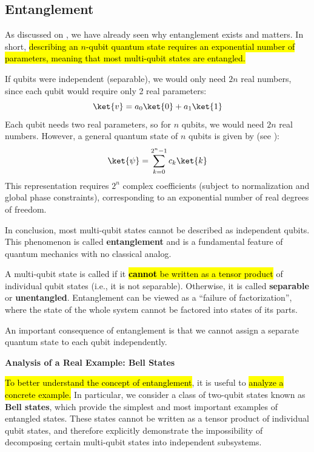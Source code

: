 \subsection{Entanglement}\label{sec:entanglement}

As discussed on , we have already seen why entanglement exists and matters. In short, \hl{describing an $n$-qubit quantum state requires an exponential number of parameters, meaning that most multi-qubit states are entangled.}

\highspace
If qubits were independent (separable), we would only need $2n$ real numbers, since each qubit would require only 2 real parameters:
\begin{equation*}
    \ket{v} = a_0 \ket{0} + a_1 \ket{1}
\end{equation*}
Each qubit needs two real parameters, so for $n$ qubits, we would need $2n$ real numbers. However, a general quantum state of $n$ qubits is given by (see ):
\begin{equation*}
    \ket{\psi} = \sum_{k=0}^{2^n-1} c_k \ket{k}
\end{equation*}
This representation requires $2^n$ complex coefficients (subject to normalization and global phase constraints), corresponding to an exponential number of real degrees of freedom.

\highspace
In conclusion, most multi-qubit states cannot be described as independent qubits. This phenomenon is called \textbf{entanglement} and is a fundamental feature of quantum mechanics with no classical analog.

\begin{definitionbox}[: Entanglement]
    A multi-qubit state is called  if it \hl{\textbf{cannot} be written as a tensor product} of individual qubit states (i.e., it is not separable). Otherwise, it is called \textbf{separable} or \textbf{unentangled}. Entanglement can be viewed as a ``failure of factorization'', where the state of the whole system cannot be factored into states of its parts.
\end{definitionbox}

\noindent
An important consequence of entanglement is that we cannot assign a separate quantum state to each qubit independently.

\highspace
\begin{flushleft}
    \textcolor{Green3}{ \textbf{Analysis of a Real Example: Bell States}}
\end{flushleft}
\hl{To better understand the concept of entanglement}, it is useful to \hl{analyze a concrete example.} In particular, we consider a class of two-qubit states known as \textbf{Bell states}, which provide the simplest and most important examples of entangled states. These states cannot be written as a tensor product of individual qubit states, and therefore explicitly demonstrate the impossibility of decomposing certain multi-qubit states into independent subsystems.

